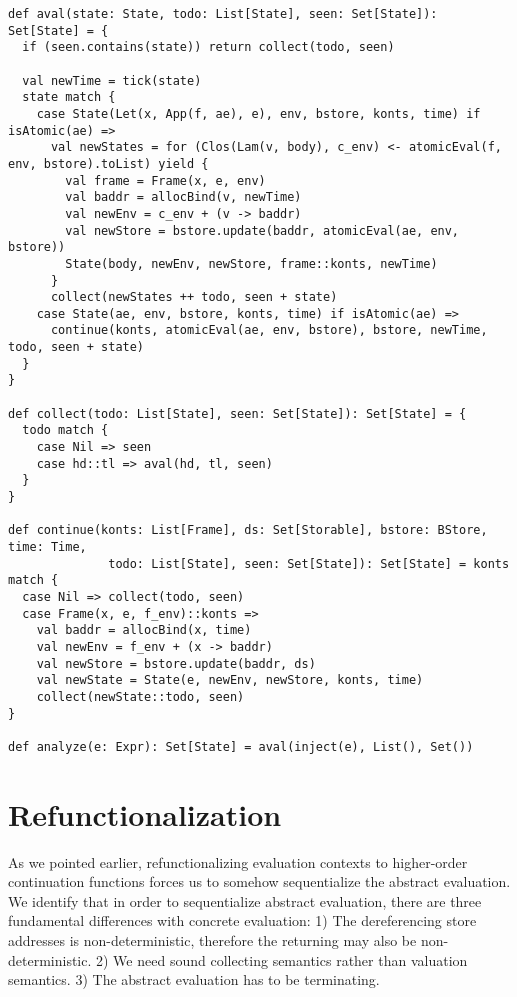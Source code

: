 \documentclass[acmsmall,review,anonymous]{acmart}\settopmatter{printfolios=true,printccs=false,printacmref=false}
\begin{document}
\begin{lstlisting}
def aval(state: State, todo: List[State], seen: Set[State]): Set[State] = { 
  if (seen.contains(state)) return collect(todo, seen)

  val newTime = tick(state)
  state match {
    case State(Let(x, App(f, ae), e), env, bstore, konts, time) if isAtomic(ae) =>
      val newStates = for (Clos(Lam(v, body), c_env) <- atomicEval(f, env, bstore).toList) yield {
        val frame = Frame(x, e, env)
        val baddr = allocBind(v, newTime)
        val newEnv = c_env + (v -> baddr)
        val newStore = bstore.update(baddr, atomicEval(ae, env, bstore))
        State(body, newEnv, newStore, frame::konts, newTime)
      }   
      collect(newStates ++ todo, seen + state)
    case State(ae, env, bstore, konts, time) if isAtomic(ae) =>
      continue(konts, atomicEval(ae, env, bstore), bstore, newTime, todo, seen + state)
  }   
}

def collect(todo: List[State], seen: Set[State]): Set[State] = { 
  todo match {
    case Nil => seen
    case hd::tl => aval(hd, tl, seen)
  } 
}

def continue(konts: List[Frame], ds: Set[Storable], bstore: BStore, time: Time,
              todo: List[State], seen: Set[State]): Set[State] = konts match {
  case Nil => collect(todo, seen)
  case Frame(x, e, f_env)::konts =>
    val baddr = allocBind(x, time)
    val newEnv = f_env + (x -> baddr)
    val newStore = bstore.update(baddr, ds) 
    val newState = State(e, newEnv, newStore, konts, time)
    collect(newState::todo, seen)
}

def analyze(e: Expr): Set[State] = aval(inject(e), List(), Set()) 
\end{lstlisting}

\section{Refunctionalization} \label{refunc}

As we pointed earlier, refunctionalizing evaluation contexts to higher-order
continuation functions forces us to somehow sequentialize the abstract evaluation.
We identify that in order to sequentialize abstract evaluation, there are three
fundamental differences with concrete evaluation: 
1) The dereferencing store addresses is non-deterministic, therefore the returning
may also be non-deterministic.
2) We need sound collecting semantics rather than valuation semantics.
3) The abstract evaluation has to be terminating.
\end{document}
